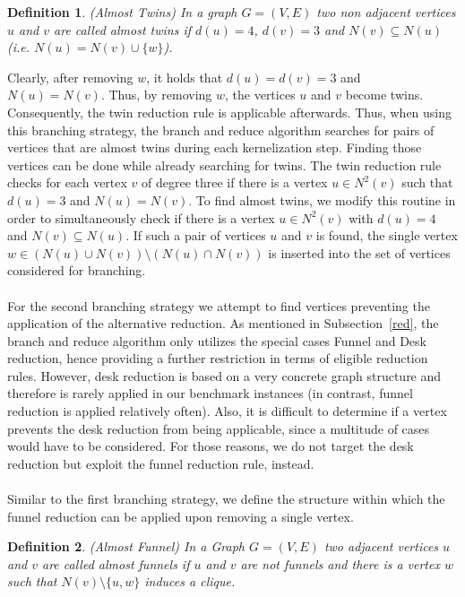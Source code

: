 \documentclass[]{article}
\newtheorem{definition}{Definition}
\begin{document}
\begin{definition} (Almost Twins)
	In a graph $G=(V,E)$ two non adjacent vertices $u$ and $v$ are called almost twins if $d(u) = 4$, $d(v) = 3$ and $N(v)\subseteq N(u)$ (i.e. $N(u) = N(v) \cup \{w\}$). 
\end{definition}

Clearly, after removing $w$, it holds that $d(u)=d(v)=3$ and $N(u)=N(v)$. Thus, by removing $w$, the vertices $u$ and $v$ become twins. Consequently, the twin reduction rule is applicable afterwards. Thus, when using this branching strategy, the branch and reduce algorithm searches for pairs of vertices that are almost twins during each kernelization step. Finding those vertices can be done while already searching for twins. The twin reduction rule checks for each vertex $v$ of degree three if there is a vertex $u \in N^2(v)$ such that $d(u) = 3$ and $N(u)=N(v)$. To find almost twins, we modify this routine in order to simultaneously check if there is a vertex $u \in N^2(v)$ with $d(u) = 4$ and $N(v)\subseteq  N(u)$. If such a pair of vertices $u$ and $v$ is found, the single vertex $w\in (N(u)\cup N(v))\setminus(N(u) \cap N(v))$ is inserted into the set of vertices considered for branching.
\paragraph{}

For the second branching strategy we attempt to find vertices preventing the application of the alternative reduction. As mentioned in Subsection~\ref{red}, the branch and reduce algorithm only utilizes the special cases Funnel and Desk reduction, hence providing a further restriction in terms of eligible reduction rules. However, desk reduction is based on a very concrete graph structure and therefore is rarely applied in our benchmark instances (in contrast, funnel reduction is applied relatively often). Also, it is difficult to determine if a vertex prevents the desk reduction from being applicable, since a multitude of cases would have to be considered.
For those reasons, we do not target the desk reduction but exploit the funnel reduction rule, instead.
\paragraph{}
Similar to the first branching strategy, we define the structure within which the funnel reduction can be applied upon removing a single vertex.
\begin{definition}(Almost Funnel)
	In a Graph $G=(V,E)$ two adjacent vertices $u$ and $v$ are called almost funnels if $u$ and $v$ are not funnels and there is a vertex $w$ such that $N(v)\setminus\{u,w\}$ induces a clique.
\end{definition}
\end{document}
